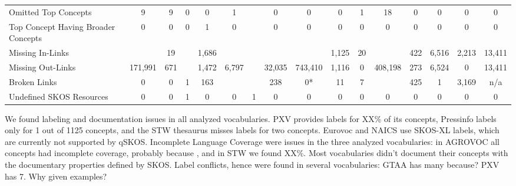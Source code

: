 \begin{table}[h]
\begin{center}
{\begin{tabular}{p{4cm}ccccccccccccccc}
Omitted Top Concepts & 9 & 9 & 0 & 0 & 1 && 0 & 0 & 0 & 1 & 18 & 0 & 0 & 0 & 0 \\

Top Concept Having Broader Concepts & 0 & 0 & 0 & 1 & 0 && 0 & 0 & 0 & 0 & 0 & 0 & 0 & 0 & 0 \\

\midrule

Missing In-Links && 19 && 1,686 &&&&& 1,125 & 20 && 422 & 6,516 & 2,213 & 13,411 \\

Missing Out-Links & 171,991 & 671 && 1,472 & 6,797 && 32,035 & 743,410 & 1,116 & 0 & 408,198 & 273 & 6,524 & 0 & 13,411 \\

Broken Links & 0 & 0 & 1 & 163 &&& 238 & 0* & 11 & 7 && 425 & 1 & 3,169 & n/a \\


Undefined SKOS Resources & 0 & 0 & 1 & 0 & 0 & 1 & 0 & 0 & 0 & 0 & 0 & 0 & 0 & 0 & 0  \\

\bottomrule
\end{tabular}
}
\end{center}
\end{table}

We found labeling and documentation issues in all analyzed vocabularies. PXV provides labels for XX\% of its concepts, Pressinfo labels only for 1 out of 1125 concepts, and the STW thesaurus misses labels for two concepts. Eurovoc and NAICS use SKOS-XL labels, which are currently not supported by qSKOS.
Incomplete Language Coverage were issues in the three analyzed vocabularies: in AGROVOC all concepts had incomplete coverage, probably because , and in STW we found XX\%.
Most vocabularies didn't document their concepts with the documentary properties defined by SKOS.
Label conflicts, hence  were found in several vocabularies: GTAA has many because? PXV has 7. Why given examples?





% 

